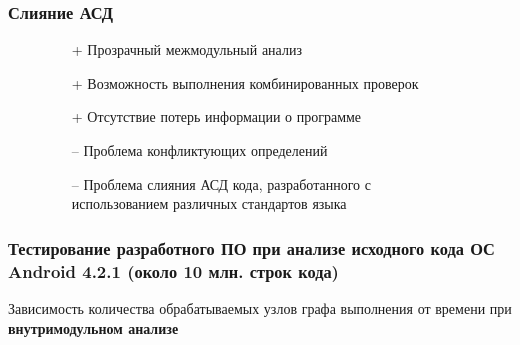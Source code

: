 \documentclass[hyperref={pdfpagelabels=false},10pt,gray]{beamer}
\begin{document}
\begin{frame}
\frametitle{Слияние АСД}
\begin{figure}[h]
  \begin{minipage}[h]{0.49\linewidth}
\begin{itemize}
 \item[+] Прозрачный межмодульный анализ
 \item[+] Возможность выполнения комбинированных проверок
 \item[+] Отсутствие потерь информации о программе
\end{itemize}
  \end{minipage}
  \hfill
  \begin{minipage}[h]{0.49\linewidth}
\begin{itemize}
 \item[--] Проблема конфликтующих определений
 \item[--] Проблема слияния АСД кода, разработанного с использованием различных стандартов языка
\end{itemize}
  \end{minipage}
\end{figure}
\end{frame}


\begin{frame}
\frametitle{Тестирование разработного ПО при анализе исходного кода ОС Android 4.2.1 (около 10 млн. строк кода)}
Зависимость количества обрабатываемых узлов графа выполнения от времени  при \textbf{внутримодульном анализе}
\begin{figure}[h]
\end{figure}
\end{frame}
\end{document}
